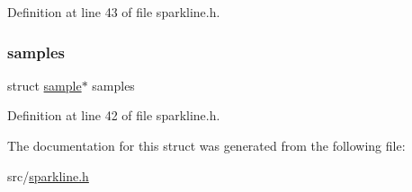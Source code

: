 Definition at line 43 of file sparkline.\+h.

\mbox{\label{structsequence_ae985c67fe47c15411bae03a679a5578e}} 
\subsubsection{\texorpdfstring{samples}{samples}}
{\footnotesize\ttfamily struct \hyperlink{structsample}{sample}$\ast$ samples}



Definition at line 42 of file sparkline.\+h.



The documentation for this struct was generated from the following file\+:\begin{DoxyCompactItemize}
\item 
src/\hyperlink{sparkline_8h}{sparkline.\+h}\end{DoxyCompactItemize}
